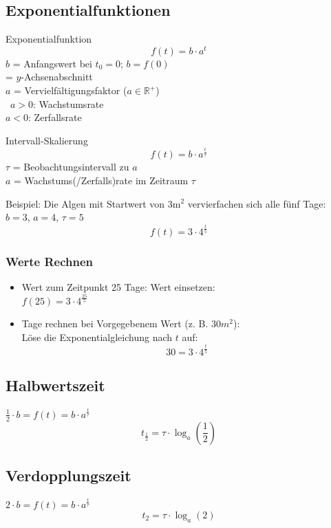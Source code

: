 \begin{multicols}{2}
\hrulefill
\section{Exponentialfunktionen}
\begin{gesetz}{Exponentialfunktion}{}
$$f(t) = b\cdot{}a^t$$
$b$ = Anfangswert bei $t_0=0$; $b=f(0)$\\
\phantom{$b$} = $y$-Achsenabschnitt\\
$a$ = Vervielfältigungsfaktor ($a\in\mathbb{R}^{+}$)\\\
$a>0$: Wachstumsrate\\
$a<0$: Zerfallsrate
\end{gesetz}


\begin{rezept}{Intervall-Skalierung}{}
$$f(t) = b\cdot{}a^{\frac{t}{\tau}}$$
$\tau$ = Beobachtungsintervall zu $a$\\
$a$ = Wachstums(/Zerfalls)rate im Zeitraum $\tau$
\end{rezept}

Beispiel: Die Algen mit Startwert von $3\textrm{m}^2$ vervierfachen
sich alle fünf Tage:\\
$b=3$, $a=4$, $\tau=5$
$$f(t)= 3\cdot{}4^\frac{t}{5}$$

\subsubsection{Werte Rechnen}
\begin{itemize}
\item
Wert zum Zeitpunkt 25 Tage: Wert einsetzen:\\
$f(25) = 3\cdot{}4^\frac{25}{5}$

\item
Tage rechnen bei Vorgegebenem Wert (z. B. $30m^2$):\\
Löse die Exponentialgleichung nach $t$ auf:\\
$$30 = 3\cdot{}4^{\frac{t}{5}}$$
\end{itemize}

\subsection{Halbwertszeit}
$\frac12 \cdot{} b = f(t) = b\cdot{}a^{\frac{t}{\tau}}$
$$t_{\frac12} = \tau\cdot{}\log_a(\frac12)$$

\subsection{Verdopplungszeit}
$2\cdot{}b = f(t) = b\cdot{}a^{\frac{t}{\tau}}$
$$t_{2} = \tau\cdot{}\log_a(2)$$


\end{multicols}
